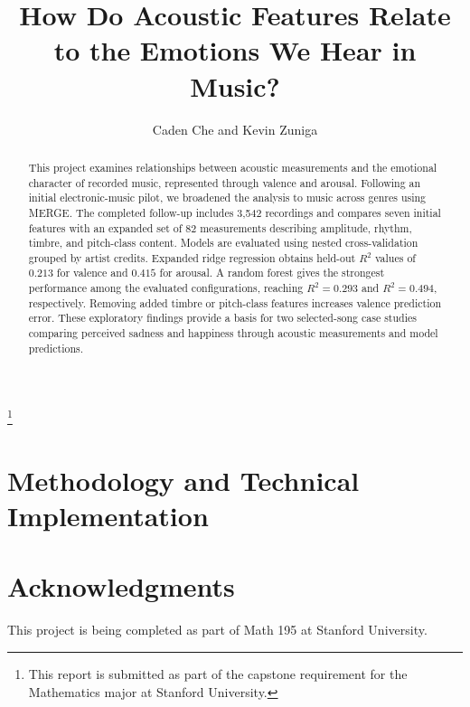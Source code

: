 


\onehalfspacing

\title{How Do Acoustic Features Relate to the Emotions We Hear in Music?}

\author{Caden Che and Kevin Zuniga}

\thanks{
This report is submitted as part of the capstone requirement
for the Mathematics major at Stanford University.
}

\begin{abstract}
This project examines relationships between acoustic measurements and the emotional character of recorded music, represented through valence and arousal. Following an initial electronic-music pilot, we broadened the analysis to music across genres using MERGE. The completed follow-up includes 3,542 recordings and compares seven initial features with an expanded set of 82 measurements describing amplitude, rhythm, timbre, and pitch-class content. Models are evaluated using nested cross-validation grouped by artist credits. Expanded ridge regression obtains held-out $R^2$ values of $0.213$ for valence and $0.415$ for arousal. A random forest gives the strongest performance among the evaluated configurations, reaching $R^2=0.293$ and $R^2=0.494$, respectively. Removing added timbre or pitch-class features increases valence prediction error. These exploratory findings provide a basis for two selected-song case studies comparing perceived sadness and happiness through acoustic measurements and model predictions.
\end{abstract}

\maketitle


\section{Methodology and Technical Implementation}
\label{sec:methodology}







\section{Acknowledgments}

This project is being completed as part of Math 195 at Stanford University.

\printbibliography

